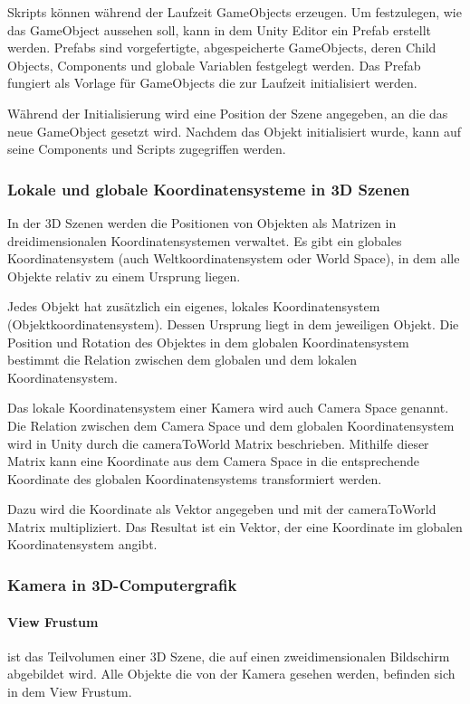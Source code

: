 Skripts können während der Laufzeit GameObjects erzeugen. Um festzulegen, wie das GameObject aussehen soll, kann in dem Unity Editor ein Prefab erstellt werden. Prefabs sind vorgefertigte, abgespeicherte GameObjects, deren Child Objects, Components und globale Variablen festgelegt werden. Das Prefab fungiert als Vorlage für GameObjects die zur Laufzeit initialisiert werden.

Während der Initialisierung wird eine Position der Szene angegeben, an die das neue GameObject gesetzt wird. Nachdem das Objekt initialisiert wurde, kann auf seine Components und Scripts zugegriffen werden.\citep{unityprefabs}


\subsubsection{Lokale und globale Koordinatensysteme in 3D Szenen}
In der 3D Szenen werden die Positionen von Objekten als Matrizen in dreidimensionalen Koordinatensystemen verwaltet.
Es gibt ein globales Koordinatensystem (auch Weltkoordinatensystem oder World Space), in dem alle Objekte relativ zu einem Ursprung liegen. 

Jedes Objekt hat zusätzlich ein eigenes, lokales Koordinatensystem (Objektkoordinatensystem). Dessen Ursprung liegt in dem jeweiligen Objekt.
Die Position und Rotation des Objektes in dem globalen Koordinatensystem bestimmt die Relation zwischen dem globalen und dem lokalen Koordinatensystem. 

Das lokale Koordinatensystem einer Kamera wird auch Camera Space genannt. Die Relation zwischen dem Camera Space und dem globalen Koordinatensystem wird in Unity durch die cameraToWorld Matrix beschrieben. Mithilfe dieser Matrix kann eine Koordinate aus dem Camera Space in die entsprechende Koordinate des globalen Koordinatensystems transformiert werden.\citep{unitycameratoworldmatrix}

Dazu wird die Koordinate als Vektor angegeben und mit der cameraToWorld Matrix multipliziert. Das Resultat ist ein Vektor, der eine Koordinate im globalen Koordinatensystem angibt.\citep{unitycameratoworldmatrix,unitymultiplyoint}

\subsubsection{Kamera in 3D-Computergrafik}
\paragraph{View Frustum}
ist das Teilvolumen einer 3D Szene, die auf einen zweidimensionalen Bildschirm abgebildet wird. Alle Objekte die von der Kamera gesehen werden, befinden sich in dem View Frustum.


